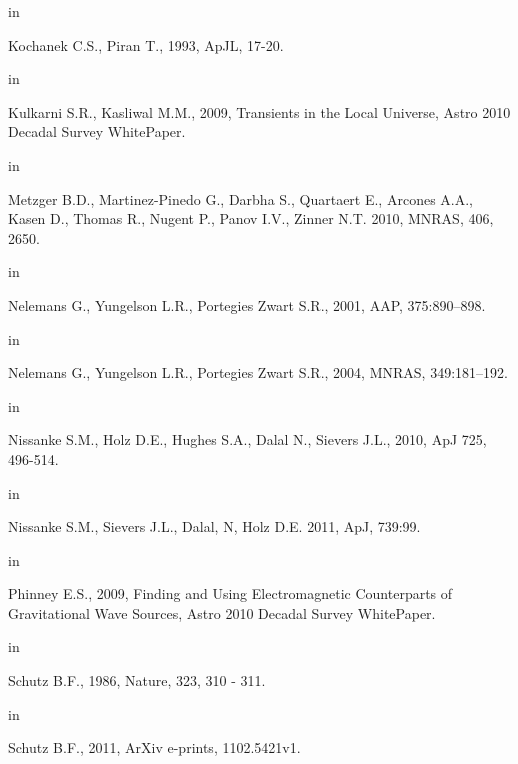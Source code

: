 \documentclass [11pt]{article}
\begin{document}
 in 
\par\noindent\hangindent=10pt
Kochanek C.S., Piran T.,
1993, ApJL, 17-20.

 in 
\par\noindent\hangindent=10pt
Kulkarni S.R., Kasliwal M.M., 
2009, Transients in the Local Universe, Astro 2010 Decadal Survey WhitePaper.

 in 
\par\noindent\hangindent=10pt
Metzger B.D., Martinez-Pinedo G., Darbha S., Quartaert E., Arcones A.A., Kasen D., Thomas R., Nugent P., Panov I.V., Zinner N.T.  
2010, MNRAS, 406, 2650.

 in 
\par\noindent\hangindent=10pt
Nelemans G., Yungelson L.R., Portegies Zwart S.R.,
2001, AAP, 375:890--898.

 in 
\par\noindent\hangindent=10pt
Nelemans G., Yungelson L.R., Portegies Zwart S.R.,
2004, MNRAS,  349:181--192.

 in 
\par\noindent\hangindent=10pt
Nissanke S.M., Holz D.E., Hughes S.A., Dalal N., Sievers J.L.,
2010, ApJ 725, 496-514.

 in 
\par\noindent\hangindent=10pt
Nissanke S.M., Sievers J.L., Dalal, N, Holz D.E.
2011, ApJ, 739:99.

 in 
\par\noindent\hangindent=10pt
Phinney E.S., 
2009, Finding and Using Electromagnetic Counterparts of Gravitational Wave Sources, Astro 2010 Decadal Survey WhitePaper.


 in 
\par\noindent\hangindent=10pt
Schutz B.F.,
1986,  Nature, 323, 310 - 311.

 in 
\par\noindent\hangindent=10pt
Schutz B.F.,
2011,  ArXiv e-prints, 1102.5421v1.

%
%

\end{document}
